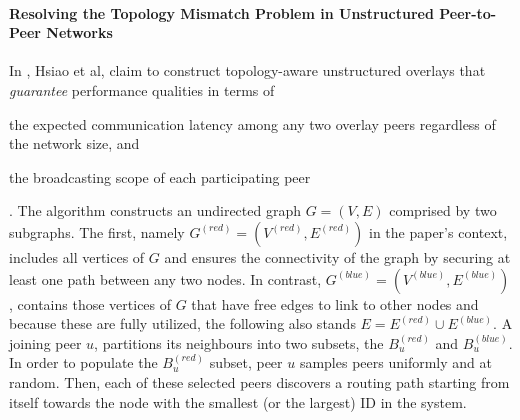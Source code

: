 %
%

\paragraph*{\bf Resolving the Topology Mismatch Problem in Unstructured
Peer-to-Peer Networks}

In \cite{hsiao_redblue_2009}, Hsiao et al, claim to construct topology-aware
unstructured overlays that \emph{guarantee} performance qualities in terms of
\begin{inparaenum}
  \item the expected communication latency among any two overlay peers
regardless of the network size, and
  \item the broadcasting scope of each participating peer
\end{inparaenum}
. The algorithm constructs an undirected graph $G = \left( V, E \right)$
comprised by two subgraphs. The first, namely $G^{\left( red \right)} = \left(
V^{\left( red \right)}, E^{\left( red \right)} \right)$ in the paper's context,
includes all vertices of $G$ and ensures the connectivity of the graph by
securing at least one path between any two nodes. In contrast, $G^{\left( blue
\right)} = \left( V^{\left( blue \right)}, E^{\left( blue \right)} \right)$,
contains those vertices of $G$ that have free edges to link to other nodes and
because these are fully utilized, the following also stands $E = E^{\left( red
\right)} \cup E^{\left( blue \right)}$. A joining peer $u$, partitions its
neighbours into two subsets, the $B_u^{\left( red \right)}$ and $B_u^{\left(
blue \right)}$. In order to populate the $B_u^{\left( red \right)}$ subset, peer
$u$ samples peers uniformly and at random. Then, each of these selected peers
discovers a routing path starting from itself towards the node with the smallest
(or the largest) ID in the system.

